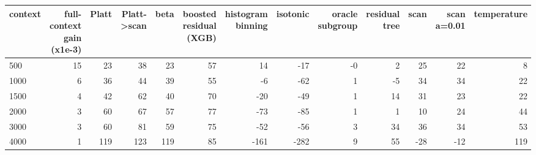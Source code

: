 \begin{tabular}{lrrrrrrrrrrrr}
\toprule
context & full-context gain (x1e-3) & Platt & Platt->scan & beta & boosted residual (XGB) & histogram binning & isotonic & oracle subgroup & residual tree & scan & scan a=0.01 & temperature \\
\midrule
500 & 15 & 23 & 38 & 23 & 57 & 14 & -17 & -0 & 2 & 25 & 22 & 8 \\
1000 & 6 & 36 & 44 & 39 & 55 & -6 & -62 & 1 & -5 & 34 & 34 & 22 \\
1500 & 4 & 42 & 62 & 40 & 70 & -20 & -49 & 1 & 14 & 31 & 23 & 22 \\
2000 & 3 & 60 & 67 & 57 & 77 & -73 & -85 & 1 & 1 & 10 & 24 & 44 \\
3000 & 3 & 60 & 81 & 59 & 75 & -52 & -56 & 3 & 34 & 36 & 34 & 53 \\
4000 & 1 & 119 & 123 & 119 & 85 & -161 & -282 & 9 & 55 & -28 & -12 & 119 \\
\bottomrule
\end{tabular}
